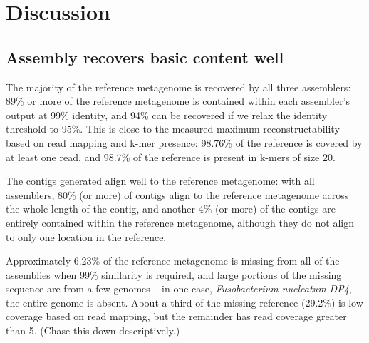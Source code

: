 \documentclass[10pt,a4paper,twocolumn]{article}
\begin{document}
\section*{Discussion}
\subsection*{Assembly recovers basic content well}

The majority of the reference metagenome is recovered by all three
assemblers: 89\% or more of the reference metagenome is contained
within each assembler’s output at 99\% identity, and 94\% can be
recovered if we relax the identity threshold to 95\%.  This is close
to the measured maximum reconstructability based on read mapping and
k-mer presence: 98.76\% of the reference is covered by at least one
read, and 98.7\% of the reference is present in k-mers of size 20.

The contigs generated align well to the reference metagenome: with all assemblers, 80\% (or
more) of contigs align to the reference metagenome across the whole
length of the contig, and another 4\% (or more) of the contigs are
entirely contained within the reference metagenome, although they do
not align to only one location in the reference.

 
Approximately 6.23\% of the reference metagenome is missing from all of
the assemblies when 99\% similarity is required, and large portions of
the missing sequence are from a few genomes -- in one case, {\em
  Fusobacterium nucleatum DP4}, the entire genome is absent.
About a third of the missing reference (29.2\%) is low coverage based on
read mapping, but the remainder has read coverage greater than 5.
(Chase this down descriptively.)



\end{document}
